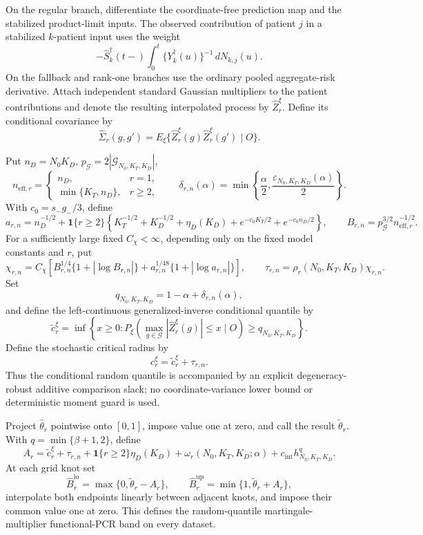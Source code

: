 On the regular branch, differentiate the coordinate-free prediction map and the stabilized product-limit inputs. The observed contribution of patient \(j\) in a stabilized \(k\)-patient input uses the weight
\[
 -\widehat S_k^\dagger(t-)
 \int_0^t\{Y_k^\dagger(u)\}^{-1}\,dN_{k,j}(u).
\]
On the fallback and rank-one branches use the ordinary pooled aggregate-risk derivative. Attach independent standard Gaussian multipliers to the patient contributions and denote the resulting interpolated process by \(\widehat Z_r^\xi\). Define its conditional covariance by
\[
 \widehat\Sigma_r(g,g')
 =E_\xi\{\widehat Z_r^\xi(g)\widehat Z_r^\xi(g')\mid O\}.
\]

Put \(n_D=N_0K_D\), \(p_{\mathcal G}=2|\mathcal G_{N_0,K_T,K_D}|\),
\[
 n_{\mathrm{eff},r}=
 \begin{cases}
 n_D,&r=1,\\
 \min\{K_T,n_D\},&r\ge2,
 \end{cases}
 \qquad
 \delta_{r,n}(\alpha)=
 \min\left\{\frac\alpha2,
 \frac{\varepsilon_{N_0,K_T,K_D}(\alpha)}2\right\}.
\]
With \(c_0=s_-g_-/3\), define
\[
 a_{r,n}=n_D^{-1/2}+\mathbf1\{r\ge2\}
 \left\{K_T^{-1/2}+K_D^{-1/2}+\eta_D(K_D)
 +e^{-c_0K_T/2}+e^{-c_0n_D/2}\right\},
 \qquad
 B_{r,n}=p_{\mathcal G}^{3/2}n_{\mathrm{eff},r}^{-1/2}.
\]
For a sufficiently large fixed \(C_\chi<\infty\), depending only on the fixed model constants and \(r\), put
\[
 \chi_{r,n}=C_\chi\left[
 B_{r,n}^{1/4}\{1+|\log B_{r,n}|\}
 +a_{r,n}^{1/48}\{1+|\log a_{r,n}|\}\right],
 \qquad
 \tau_{r,n}=\rho_r(N_0,K_T,K_D)\chi_{r,n}.
\]
Set
\[
 q_{N_0,K_T,K_D}=1-\alpha+\delta_{r,n}(\alpha),
\]
and define the left-continuous generalized-inverse conditional quantile by
\[
 \widetilde c_r^\xi=
 \inf\left\{x\ge0:
 P_\xi\left(\max_{g\in\mathcal G}|\widehat Z_r^\xi(g)|\le x
 \mid O\right)\ge q_{N_0,K_T,K_D}\right\}.
\]
Define the stochastic critical radius by
\[
 c_r^\xi=\widetilde c_r^\xi+\tau_{r,n}.
\]
Thus the conditional random quantile is accompanied by an explicit degeneracy-robust additive comparison slack; no coordinate-variance lower bound or deterministic moment guard is used.

Project \(\widehat\theta_r\) pointwise onto \([0,1]\), impose value one at zero, and call the result \(\widetilde\theta_r\). With \(q=\min\{\beta+1,2\}\), define
\[
 A_r=\widetilde c_r^\xi+\tau_{r,n}
 +\mathbf1\{r\ge2\}\eta_D(K_D)
 +\omega_r(N_0,K_T,K_D;\alpha)
 +c_{\mathrm{int}}h_{N_0,K_T,K_D}^{q}.
\]
At each grid knot set
\[
 \widehat B_r^{\mathrm{lo}}=
 \max\{0,\widetilde\theta_r-A_r\},\qquad
 \widehat B_r^{\mathrm{up}}=
 \min\{1,\widetilde\theta_r+A_r\},
\]
interpolate both endpoints linearly between adjacent knots, and impose their common value one at zero. This defines the random-quantile martingale-multiplier functional-PCR band on every dataset.
